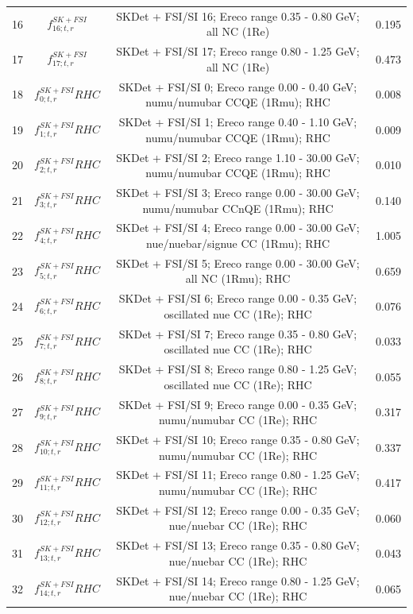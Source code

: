 \begin{tabular} { | c | c | c | c |  }
16 & $f_{16; t, r}^{SK+FSI}$ & SKDet + FSI/SI 16; Ereco range 0.35 - 0.80 GeV; all NC (1Re) & 0.195\\ 
17 & $f_{17; t, r}^{SK+FSI}$ & SKDet + FSI/SI 17; Ereco range 0.80 - 1.25 GeV; all NC (1Re) & 0.473\\ 
18 & $f_{0; t, r}^{SK+FSI}RHC$ & SKDet + FSI/SI  0; Ereco range 0.00 - 0.40 GeV; numu/numubar CCQE (1Rmu); RHC & 0.008\\ 
19 & $f_{1; t, r}^{SK+FSI}RHC$ & SKDet + FSI/SI  1; Ereco range 0.40 - 1.10 GeV; numu/numubar CCQE (1Rmu); RHC & 0.009\\ 
20 & $f_{2; t, r}^{SK+FSI}RHC$ & SKDet + FSI/SI  2; Ereco range 1.10 - 30.00 GeV; numu/numubar CCQE (1Rmu); RHC & 0.010\\ 
21 & $f_{3; t, r}^{SK+FSI}RHC$ & SKDet + FSI/SI  3; Ereco range 0.00 - 30.00 GeV; numu/numubar CCnQE (1Rmu); RHC & 0.140\\ 
22 & $f_{4; t, r}^{SK+FSI}RHC$ & SKDet + FSI/SI  4; Ereco range 0.00 - 30.00 GeV; nue/nuebar/signue CC (1Rmu); RHC & 1.005\\ 
23 & $f_{5; t, r}^{SK+FSI}RHC$ & SKDet + FSI/SI  5; Ereco range 0.00 - 30.00 GeV; all NC (1Rmu); RHC & 0.659\\ 
24 & $f_{6; t, r}^{SK+FSI}RHC$ & SKDet + FSI/SI  6; Ereco range 0.00 - 0.35 GeV; oscillated nue CC (1Re); RHC & 0.076\\ 
25 & $f_{7; t, r}^{SK+FSI}RHC$ & SKDet + FSI/SI  7; Ereco range 0.35 - 0.80 GeV; oscillated nue CC (1Re); RHC & 0.033\\ 
26 & $f_{8; t, r}^{SK+FSI}RHC$ & SKDet + FSI/SI  8; Ereco range 0.80 - 1.25 GeV; oscillated nue CC (1Re); RHC & 0.055\\ 
27 & $f_{9; t, r}^{SK+FSI}RHC$ & SKDet + FSI/SI  9; Ereco range 0.00 - 0.35 GeV; numu/numubar CC (1Re); RHC & 0.317\\ 
28 & $f_{10; t, r}^{SK+FSI}RHC$ & SKDet + FSI/SI 10; Ereco range 0.35 - 0.80 GeV; numu/numubar CC (1Re); RHC & 0.337\\ 
29 & $f_{11; t, r}^{SK+FSI}RHC$ & SKDet + FSI/SI 11; Ereco range 0.80 - 1.25 GeV; numu/numubar CC (1Re); RHC & 0.417\\ 
30 & $f_{12; t, r}^{SK+FSI}RHC$ & SKDet + FSI/SI 12; Ereco range 0.00 - 0.35 GeV; nue/nuebar CC (1Re); RHC & 0.060\\ 
31 & $f_{13; t, r}^{SK+FSI}RHC$ & SKDet + FSI/SI 13; Ereco range 0.35 - 0.80 GeV; nue/nuebar CC (1Re); RHC & 0.043\\ 
32 & $f_{14; t, r}^{SK+FSI}RHC$ & SKDet + FSI/SI 14; Ereco range 0.80 - 1.25 GeV; nue/nuebar CC (1Re); RHC & 0.065\\ 

\end{tabular}
